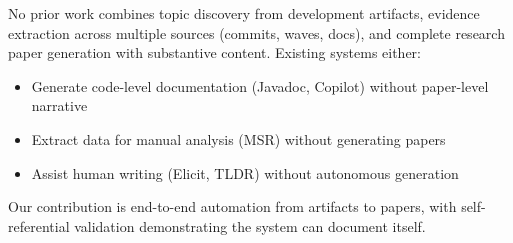 No prior work combines topic discovery from development artifacts, evidence extraction across multiple sources (commits, waves, docs), and complete research paper generation with substantive content. Existing systems either:
\begin{itemize}
\item Generate code-level documentation (Javadoc, Copilot) without paper-level narrative
\item Extract data for manual analysis (MSR) without generating papers
\item Assist human writing (Elicit, TLDR) without autonomous generation
\end{itemize}

Our contribution is end-to-end automation from artifacts to papers, with self-referential validation demonstrating the system can document itself.